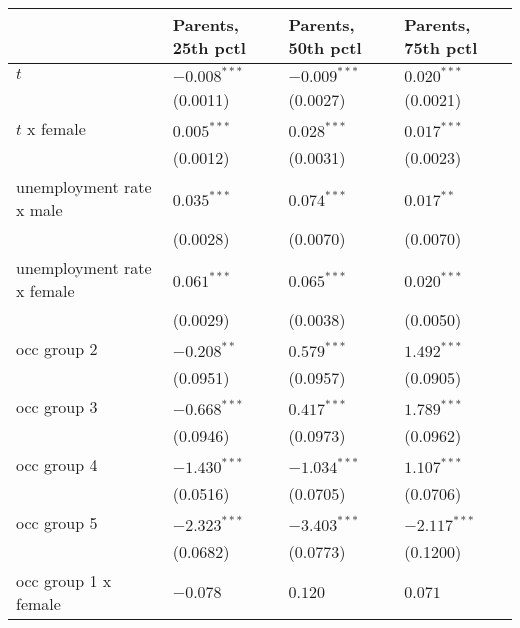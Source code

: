 \begin{tabular}{llll}
\toprule
{} & Parents, 25th pctl & Parents, 50th pctl & Parents, 75th pctl \\
\midrule
$t$                                    &     $-0.008^{***}$ &     $-0.009^{***}$ &      $0.020^{***}$ \\
                                       &           (0.0011) &           (0.0027) &           (0.0021) \\
$t$ x female                           &      $0.005^{***}$ &      $0.028^{***}$ &      $0.017^{***}$ \\
                                       &           (0.0012) &           (0.0031) &           (0.0023) \\
unemployment rate x male               &      $0.035^{***}$ &      $0.074^{***}$ &       $0.017^{**}$ \\
                                       &           (0.0028) &           (0.0070) &           (0.0070) \\
unemployment rate x female             &      $0.061^{***}$ &      $0.065^{***}$ &      $0.020^{***}$ \\
                                       &           (0.0029) &           (0.0038) &           (0.0050) \\
occ group 2                            &      $-0.208^{**}$ &      $0.579^{***}$ &      $1.492^{***}$ \\
                                       &           (0.0951) &           (0.0957) &           (0.0905) \\
occ group 3                            &     $-0.668^{***}$ &      $0.417^{***}$ &      $1.789^{***}$ \\
                                       &           (0.0946) &           (0.0973) &           (0.0962) \\
occ group 4                            &     $-1.430^{***}$ &     $-1.034^{***}$ &      $1.107^{***}$ \\
                                       &           (0.0516) &           (0.0705) &           (0.0706) \\
occ group 5                            &     $-2.323^{***}$ &     $-3.403^{***}$ &     $-2.117^{***}$ \\
                                       &           (0.0682) &           (0.0773) &           (0.1200) \\
occ group 1 x female                   &           $-0.078$ &            $0.120$ &            $0.071$ \\

\end{tabular}
